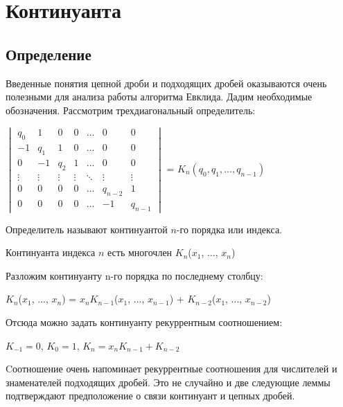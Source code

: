 \documentclass[12pt]{article}
\begin{document}
\section{Континуанта}
\subsection{Определение}
Введенные понятия цепной дроби и подходящих дробей оказываются
очень полезными для анализа работы алгоритма Евклида. Дадим необходимые обозначения. Рассмотрим трехдиагональный определитель:\par
$\begin{vmatrix}
        q_0    & 1      & 0      & 0      & ...    & 0       & 0       \\
        -1     & q_1    & 1      & 0      & ...    & 0       & 0       \\
        0      & -1     & q_2    & 1      & ...    & 0       & 0       \\
        \vdots & \vdots & \vdots & \vdots & \ddots & \vdots  & \vdots  \\
        0      & 0      & 0      & 0      & ...    & q_{n-2} & 1       \\
        0      & 0      & 0      & 0      & ...    & -1      & q_{n-1}
    \end{vmatrix}$
= $K_n(q_0, q_1, ..., q_{n-1})$

Определитель называют континуантой $n$-го порядка или индекса.


Континуанта индекса $n$ есть многочлен $K_n$($x_1$, ..., $x_n$)\par
Разложим континуанту n-го порядка по последнему столбцу:\par
$K_n$($x_1$, ..., $x_n$) = $x_n K_{n-1}$($x_1$, ..., $x_{n-1}$) + $K_{n-2}$($x_1$, ..., $x_{n-2}$)\par
Отсюда можно задать континуанту рекуррентным соотношением:\par
$K_{-1} = 0$,   $K_0 = 1$, $K_n = x_nK_{n - 1} + K_{n - 2}$ \par
Cоотношение очень напоминает рекуррентные соотношения для числителей и знаменателей подходящих дробей. Это не случайно и две следующие леммы подтверждают предположение о связи континуант и цепных дробей.
\end{document}
